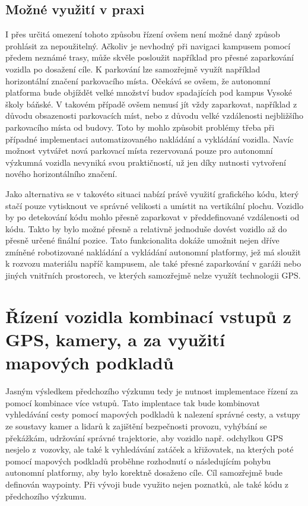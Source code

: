 \documentclass[czech, bachelor]{diploma}
\begin{document}
\subsection{Možné využití v praxi}

I přes určitá omezení tohoto způsobu řízení ovšem není možné daný způsob prohlásit za nepoužitelný. Ačkoliv je nevhodný
při navigaci kampusem pomocí předem neznámé trasy, může skvěle posloužit například pro přesné zaparkování vozidla po dosažení
cíle. K parkování lze samozřejmě využít například horizontální značení parkovacího místa. Očekává se ovšem, že autonomní platforma
bude objíždět velké množství budov spadajících pod kampus Vysoké školy báňské. V takovém případě ovšem nemusí jít vždy zaparkovat,
například z důvodu obsazenosti parkovacích míst, nebo z důvodu velké vzdálenosti nejbližšího parkovacího místa od budovy. Toto by
mohlo způsobit problémy třeba při případné implementaci automatizovaného nakládání a vykládání vozidla. Navíc možnost vytvářet
nová parkovací místa rezervovaná pouze pro autonomní výzkumná vozidla nevyniká svou praktičností, už jen díky nutnosti vytvoření
nového horizontálního značení.

Jako alternativa se v takovéto situaci nabízí právě využití grafického kódu, který stačí pouze vytisknout ve správné velikosti
a umístit na vertikální plochu. Vozidlo by po detekování kódu mohlo přesně zaparkovat v předdefinované vzdálenosti od kódu. Takto
by bylo možné přesně a relativně jednoduše dovést vozidlo až do přesně určené finální pozice. Tato funkcionalita dokáže umožnit
nejen dříve zmíněné robotizované nakládání a vykládání autonomní platformy, jež má sloužit k rozvozu materiálu napříč kampusem,
ale také přesné zaparkování v garáži nebo jiných vnitřních prostorech, ve kterých samozřejmě nelze využít technologii GPS.

\section{Řízení vozidla kombinací vstupů z GPS, kamery, a za využití mapových podkladů} \label{combination-of-driving-inputs}

Jasným výsledkem předchozího výzkumu tedy je nutnost implementace řízení za pomocí kombinace více vstupů. Tato implentace tak bude
kombinovat vyhledávání cesty pomocí mapových podkladů k nalezení správné cesty, a vstupy ze soustavy kamer a lidarů k zajištění
bezpečnosti provozu, vyhýbání se překážkám, udržování správné trajektorie, aby vozidlo např. odchylkou GPS nesjelo z~vozovky,
ale také k vyhledávání zatáček a křižovatek, na kterých poté pomocí mapových podkladů proběhne rozhodnutí o následujícím pohybu
autonomní platformy, aby bylo korektně dosaženo cíle. Cíl samozřejmě bude definován waypointy. Při vývoji bude využito nejen
poznatků, ale také kódu z předchozího výzkumu.
\end{document}
